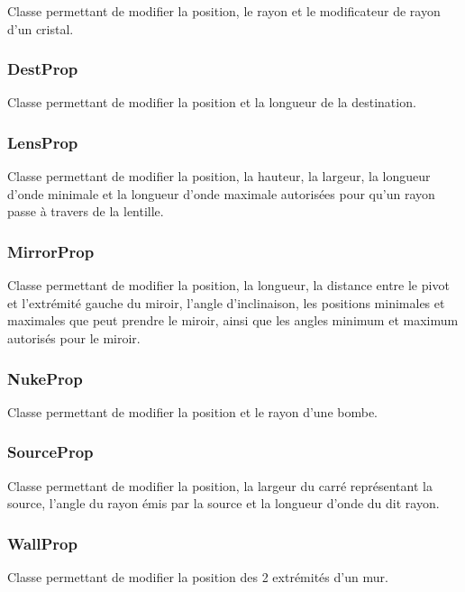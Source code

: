 \documentclass[]{report}
\begin{document}
Classe permettant de modifier la position, le rayon et le modificateur de rayon d’un cristal.

\subsubsection{\label{DestProp}DestProp}

Classe permettant de modifier la position et la longueur de la destination. 

\subsubsection{\label{LensProp}LensProp}

Classe permettant de modifier la position, la hauteur, la largeur, la longueur d’onde minimale et la longueur d’onde maximale autorisées pour qu’un rayon passe à travers de la lentille.

\subsubsection{\label{MirrorProp}MirrorProp}

Classe permettant de modifier la position, la longueur, la distance entre le pivot et l’extrémité gauche du miroir, l’angle d’inclinaison, les positions minimales et maximales que peut prendre le miroir, ainsi que les angles minimum et maximum autorisés pour le miroir.

\subsubsection{\label{NukeProp}NukeProp}

Classe permettant de modifier la position et le rayon d’une bombe.

\subsubsection{\label{SourceProp}SourceProp}

Classe permettant de modifier la position, la largeur du carré représentant la source, l’angle du rayon émis par la source et la longueur d’onde du dit rayon.

\subsubsection{\label{WallProp}WallProp}

Classe permettant de modifier la position des 2 extrémités d’un mur.
\end{document}

